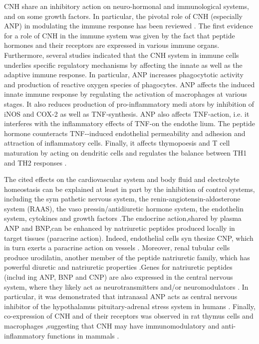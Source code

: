 \documentclass[14pt,a4paper,onecolumn]{extarticle}
\begin{document}
CNH share an inhibitory action on neuro-hormonal and immunological systems, and on some growth factors. In particular, the pivotal role of CNH (especially ANP) in modulating the immune response has been reviewed \citep{98}. The first evidence for a role of CNH in the immune system was given by the fact that peptide hormones and their receptors are expressed in various immune organs. Furthermore, several studies indicated that the CNH system in immune cells underlies specific regulatory mechanisms by affecting the innate as well as the adaptive immune response. In particular, ANP increases phagocytotic activity and production of reactive oxygen species of phagocytes. ANP affects the induced innate immune response by regulating the activation of macrophages at various stages. It also reduces production of pro-inflammatory medi ators by inhibition of iNOS and COX-2 as well as TNF-\alpha synthesis. ANP also affects TNF-\alpha action, i.e. it interferes with the inflammatory effects of TNF-\alpha on the endothe lium. The peptide hormone counteracts TNF-\alpha-induced endothelial permeability and adhesion and attraction of inflammatory cells. Finally, it affects thymopoesis and T cell maturation by acting on dendritic cells and regulates the balance between TH1 and TH2 responses \citep{99}.

The cited effects on the cardiovascular system and body fluid and electrolyte homeostasis can be explained at least in part by the inhibition of control systems, including the sym pathetic nervous system, the renin-angiotensin-aldosterone system (RAAS), the vaso pressin/antidiuretic hormone system, the endothelin system, cytokines and growth factors \citep{90} \citep{91} \citep{92} \citep{93} \citep{94} \citep{95} \citep{96} \citep{97} \citep{98} \citep{99}.The endocrine action,shared by plasma ANP and BNP,can be enhanced by natriuretic peptides produced locally in target tissues (paracrine action). Indeed, endothelial cells syn thesize CNP, which in turn exerts a paracrine action on vessels \citep{57} \citep{84} \citep{85} \citep{86} \citep{87} \citep{88}. Moreover, renal tubular cells produce urodilatin, another member of the peptide natriuretic family, which has powerful diuretic and natriuretic properties \citep{100}.Genes for natriuretic peptides (includ ing ANP, BNP and CNP) are also expressed in the central nervous system, where they likely act as neurotransmitters and/or neuromodulators \citep{91} \citep{92} \citep{93} \citep{100} \citep{101} \citep{102}. In particular, it was demonstrated that intranasal ANP acts as central nervous inhibitor of the hypothalamus pituitary-adrenal stress system in humans \citep{103}. Finally, co-expression of CNH and of their receptors was observed in rat thymus cells and macrophages \citep{104} \citep{105},suggesting that CNH may have immunomodulatory and anti-inflammatory functions in mammals \citep{106}.
\end{document}
